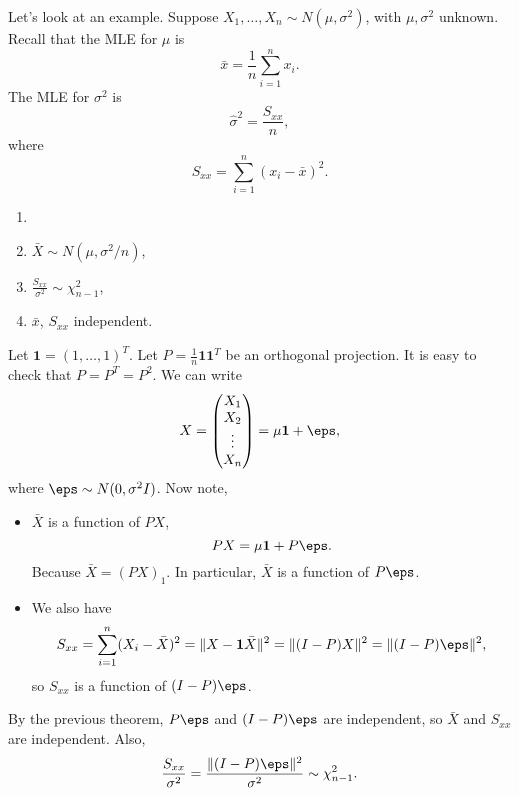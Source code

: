 \documentclass[12pt]{article}
\begin{document}
Let's look at an example. Suppose $X_1, \ldots, X_n \sim N(\mu, \sigma^2)$, with $\mu, \sigma^2$ unknown. Recall that the MLE for $\mu$ is
\[
\bar x = \frac{1}{n} \sum_{i = 1}^{n} x_i.
\]
The MLE for $\sigma^2$ is
\[
\hat \sigma^2 = \frac{S_{xx}}{n},
\]
where
\[
S_{xx} = \sum_{i = 1}^{n} (x_i - \bar x)^2.
\]
\begin{theorem}
	\begin{enumerate}[\normalfont(i)]
		\item[]
		\item $\bar X \sim N(\mu, \sigma^2/n)$,
		\item $\frac{S_{xx}}{\sigma^2} \sim \chi_{n-1}^2$,
		\item $\bar x$, $S_{xx}$ independent.
	\end{enumerate}
\end{theorem}

\begin{proofbox}
	Let $\mathbf{1} = (1, \ldots, 1)^{T}$. Let $P= \frac{1}{n} \mathbf{1} \mathbf{1}^{T}$ be an orthogonal projection. It is easy to check that $P = P^{T} = P^2$. We can write
	\[
	X =
	\begin{pmatrix}
		X_1 \\ X_2 \\ \vdots \\ X_n
	\end{pmatrix}
	 = \mu \mathbf{1} + \eps,
	\]
	where $\eps \sim N(0, \sigma^2 I)$. Now note,
	\begin{itemize}
		\item $\bar X$ is a function of $PX$,
			\[
			PX = \mu \mathbf{1} + P\eps.
			\]
			Because $\bar X = (PX)_1$. In particular, $\bar X$ is a function of $P\eps$.
		\item We also have
			\[
			S_{x x} = \sum_{i = 1}^{n} (X_i - \bar X)^2 = \|X - \mathbf{1}\bar X \|^2 = \|(I-P)X\|^2 = \|(I-P)\eps\|^2,
			\]
			so $S_{x x}$ is a function of $(I-P)\eps$.
	\end{itemize}
	By the previous theorem, $P\eps$ and $(I-P)\eps$ are independent, so $\bar X$ and $S_{xx}$ are independent. Also,
	\[
	\frac{S_{x x}}{\sigma^2} = \frac{\|(I-P)\eps\|^2}{\sigma^2} \sim \chi_{n-1}^2.
	\]
\end{proofbox}

\newpage

\printindex
\end{document}
